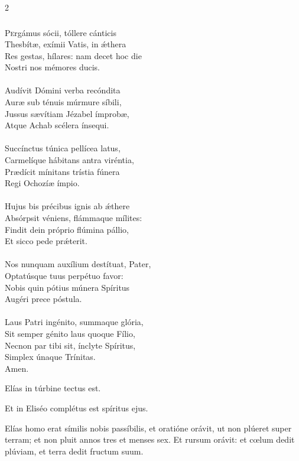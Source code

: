 \documentclass[9pt,twoside]{extarticle}
\begin{document}
\begin{multicols}{2}
\subsubsection*{\center {}}
\lettrine{P}ergámus sócii, tóllere cánticis\\
Thesbítæ, exímii Vatis, in ǽthera\\
Res gestas, hílares: nam decet hoc die\\
Nostri nos mémores ducis.\\
\\
Audívit Dómini verba recóndita\\
Auræ sub ténuis múrmure síbili,\\
Jussus sævítiam Jézabel ímprobæ,\\
Atque Achab scélera ínsequi.\\
\\
Succínctus túnica pellícea latus,\\
Carmelíque hábitans antra viréntia,\\
Prædícit mínitans trístia fúnera\\
Regi Ochozíæ ímpio.\\
\\
Hujus bis précibus ignis ab ǽthere\\
Absórpsit véniens, flámmaque mílites:\\
Findit dein próprio flúmina pállio,\\
Et sicco pede prǽterit.\\
\\
Nos nunquam auxílium destítuat, Pater,\\
Optatúsque tuus perpétuo favor:\\
Nobis quin pótius múnera Spíritus\\
Augéri prece póstula.\\
\\
Laus Patri ingénito, summaque glória,\\
Sit semper génito laus quoque Fílio,\\
Necnon par tibi sit, ínclyte Spíritus,\\
Simplex únaque Trínitas.\\
Amen.

\begin{tightlist}
\item {} Elías in túrbine tectus est. 
\item {} Et in Eliséo complétus est spíritus ejus.
\item {} Elías homo erat símilis nobis passíbilis, et oratióne orávit, ut non plúeret super terram; et non pluit annos tres et menses sex. Et rursum orávit: et cœlum dedit plúviam, et terra dedit fructum suum.
\end{tightlist}


\end{multicols}
\end{document}
